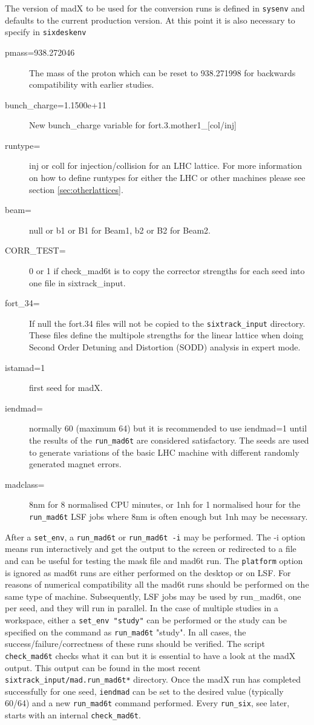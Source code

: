 \documentclass{cernatsnote}    %
\begin{document}
The version of madX to be used for the conversion runs is defined
in {\tt sysenv} and defaults to the current production version.
At this point it is also necessary to specify in {\tt sixdeskenv}
\begin{description}
\item [pmass=938.272046] The mass of the proton \cite{NIST} which can be reset to
938.271998 for backwards compatibility with earlier studies.
\item [bunch\_charge=1.1500e+11] New bunch\_charge variable for fort.3.mother1\_[col/inj]
\item [runtype=] inj or coll for injection/collision for an LHC lattice.
For more information on how to define runtypes
for either the LHC or other machines please see section \ref{sec:otherlattices}.
\item [beam=] null or b1 or B1 for Beam1, b2 or B2 for Beam2.
\item [CORR\_TEST=]0 or 1 if check\_mad6t is to copy the corrector strengths
for each seed into one file in sixtrack\_input.
\item [fort\_34=] If null the fort.34 files will not be copied 
to the {\tt sixtrack\_input} directory. These files define the multipole strengths for the
linear lattice when doing Second Order Detuning and Distortion (SODD)
 analysis in expert mode.
\item [istamad=1] first seed for madX.
\item [iendmad=] normally 60 (maximum 64) but it is recommended to use 
iendmad=1 until the results of the {\tt run\_mad6t} are considered satisfactory.
The seeds are used to generate variations of the basic LHC machine with different
randomly generated magnet errors.
\item[madclass=] 8nm for 8 normalised CPU minutes, or 1nh for 1 normalised hour
for the {\tt run\_mad6t} LSF jobs where 8nm is often enough but 1nh may be
necessary.
\end{description}
After a {\tt set\_env}, a {\tt run\_mad6t} or {\tt run\_mad6t -i} may be performed.
The -i option means run interactively and get the output to the screen or
redirected to a file and can be useful for testing the mask file and mad6t run.
The {\tt platform} option is ignored as mad6t runs are either performed on 
the desktop or on LSF. For reasons of numerical compatibility all the {mad6t}  
runs should be performed on the same type of machine.
Subsequently, LSF jobs may be used by {run\_mad6t}, one per seed, and they will
run in parallel. 
In the case of multiple studies in a workspace, either a {\tt set\_env "study"} 
can be performed or the study can be specified on the command as 
{\tt run\_mad6t} "study".
In all cases, the success/failure/correctness of these runs should
be verified. The script {\tt check\_mad6t} checks what it can but it is
essential to have a look at the madX output. This output can be found in the
most recent {\tt sixtrack\_input/mad.run\_mad6t*} directory.
Once the madX run has completed successfully for one seed, {\tt iendmad}
can be set to the desired value (typically 60/64) and a new {\tt run\_mad6t} command
performed. Every {\tt run\_six}, see later, starts with an internal {\tt check\_mad6t}.
\end{document}
